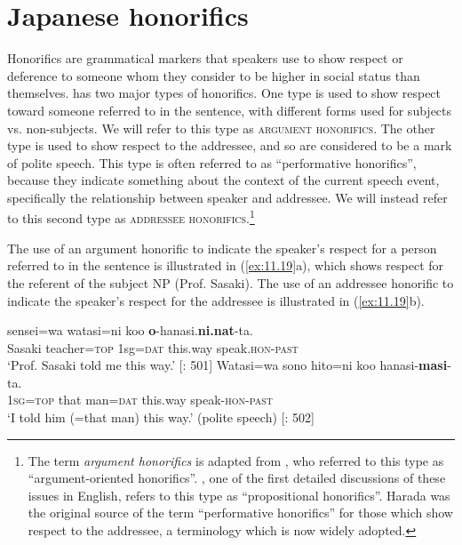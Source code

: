 \section{Japanese honorifics}\label{sec:11.3}

Honorifics are grammatical markers that speakers use to show respect or deference to someone whom they consider to be higher in social status than themselves.  has two major types of honorifics. One type is used to show respect toward someone referred to in the sentence, with different forms used for subjects vs. non-subjects. We will refer to this type as \textsc{argument honorifics}. The other type is used to show respect to the addressee, and so are considered to be a mark of polite speech. This type is often referred to as “performative honorifics”, because they indicate something about the context of the current speech event, specifically the relationship between speaker and addressee. We will instead refer to this second type as \textsc{addressee honorifics}.\footnote{The term \textit{argument honorifics} is adapted from \citet{Potts2005}, who referred to this type as “argument-oriented honorifics”. \citet{Harada1976}, one of the first detailed discussions of these issues in English, refers to this type as “propositional honorifics”. Harada was the original source of the term “performative honorifics” for those which show respect to the addressee, a terminology which is now widely adopted.}


The use of an argument honorific to indicate the speaker’s respect for a person referred to in the sentence is illustrated in (\ref{ex:11.19}a), which shows respect for the referent of the subject NP (Prof. {Sasaki}). The use of an addressee honorific to indicate the speaker’s respect for the addressee is illustrated in (\ref{ex:11.19}b).


\ea \label{ex:11.19}
\ea   {}  sensei=wa  watasi=ni  koo  \textbf{o}-hanasi.\textbf{ni.nat}-ta.\\
{Sasaki}  teacher=\textsc{top}  1sg=\textsc{dat}  this.way  speak.\textsc{hon-past}\\
\glt ‘Prof. {Sasaki} told me this way.’  [\citealt{Harada1976}: 501]
\ex \gll
    Watasi=wa  sono  hito=ni  koo  hanasi-\textbf{masi}-ta.\\
\textsc{1sg}=\textsc{top}  that  man=\textsc{dat}  this.way  speak-\textsc{hon-past}\\
\glt ‘I told him (=that man) this way.’  (polite speech)   [\citealt{Harada1976}: 502]
\z \z



